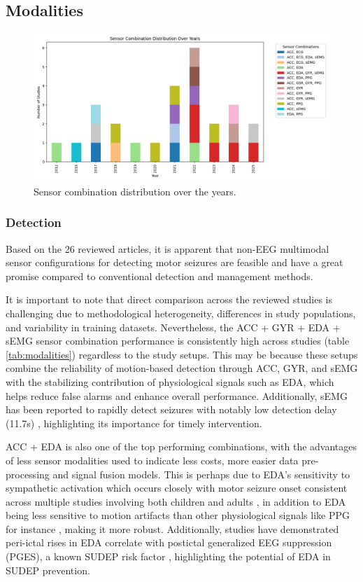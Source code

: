\subsection{Modalities}

\begin{figure}
    \centering
    \includegraphics[width=1\textwidth]{Discussion/figures/Sensor_Combination_Distribution_Over_the_Years.png}
    \caption{Sensor combination distribution over the years.}
    \label{fig:sensor_comb_over_years}
\end{figure}

\subsubsection{Detection}
Based on the 26 reviewed articles, it is apparent that non-EEG multimodal sensor configurations for detecting motor seizures are feasible and have a great promise compared to conventional detection and management methods. 

It is important to note that direct comparison across the reviewed studies is challenging due to methodological heterogeneity, differences in study populations, and variability in training datasets. Nevertheless, the ACC + GYR + EDA + sEMG sensor combination performance is consistently high across studies (table \ref{tab:modalities}) regardless to the study setups. This may be because these setups combine the reliability of motion-based detection through ACC, GYR, and sEMG with the stabilizing contribution of physiological signals such as EDA, which helps reduce false alarms and enhance overall performance. Additionally, sEMG has been reported to rapidly detect seizures with notably low detection delay (11.7s) \cite{De_Cooman2018-pq}, highlighting its importance for timely intervention.

ACC + EDA is also one of the top performing combinations, with the advantages of less sensor modalities used to indicate less costs, more easier data pre-processing and signal fusion models. This is perhaps due to EDA’s sensitivity to sympathetic activation which occurs closely with motor seizure onset consistent across multiple studies involving both children and adults \cite{Casanovas_Ortega2022-yx}, in addition to EDA being less sensitive to motion artifacts than other physiological signals like PPG for instance \cite{Ismail2021-fs}, making it more robust. Additionally, studies have demonstrated peri-ictal rises in EDA correlate with postictal generalized EEG suppression (PGES), a known SUDEP risk factor \cite{Barot2019-nx,Regalia2019-ch}, highlighting the potential of EDA in SUDEP prevention.


